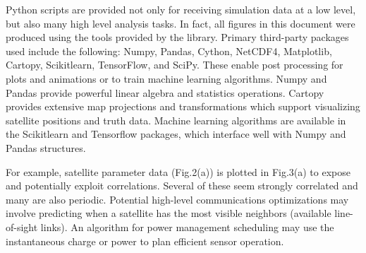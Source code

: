 \documentclass[conference]{IEEEtran}
\begin{document}
Python scripts are provided not only for receiving simulation data at a low level, but also many high level analysis tasks.  In fact, all figures in this document were produced using the tools provided by the library.  Primary third-party packages used include the following: Numpy, Pandas, Cython, NetCDF4, Matplotlib, Cartopy, Scikitlearn, TensorFlow, and SciPy.  These enable post processing for plots and animations or to train machine learning algorithms.  Numpy and Pandas provide powerful linear algebra and statistics operations.  Cartopy provides extensive map projections and transformations which support visualizing satellite positions and truth data.  Machine learning algorithms are available in the Scikitlearn and Tensorflow packages, which interface well with Numpy and Pandas structures.

For example, satellite parameter data (Fig.2(a)) is plotted in Fig.3(a) to expose and potentially exploit correlations.  Several of these seem strongly correlated and many are also periodic.  Potential high-level communications optimizations may involve predicting when a satellite has the most visible neighbors (available line-of-sight links).  An algorithm for power management scheduling may use the instantaneous charge or power to plan efficient sensor operation.
\end{document}
